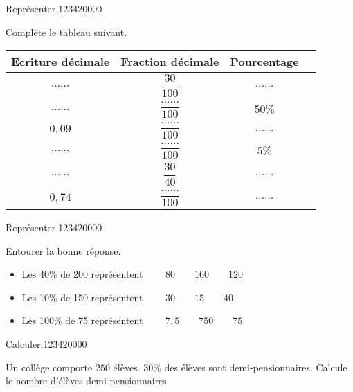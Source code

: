\begin{pageParcoursu} 

 
\begin{ExoCu}{Représenter.}{1234}{2}{0}{0}{0}{0}

Complète le tableau suivant.

 \begin{tabular}{|c|c|c|c|}
  \hline 
  Ecriture décimale & Fraction décimale & Pourcentage \\ 
  \hline 
  $\ldots\ldots$  & $\dfrac{30}{100}$  &  $\ldots\ldots$  \\ 
  \hline 
  $\ldots\ldots$  & $\dfrac{\ldots\ldots}{100}$    & $50\%$  \\ 
  \hline 
 $0,09$  & $\dfrac{\ldots\ldots}{100}$   & $\ldots\ldots$   \\ 
  \hline 
$\ldots\ldots$    & $\dfrac{\ldots\ldots}{100}$   &  $5\%$   \\ 
  \hline 
$\ldots\ldots$    & $\dfrac{30}{40}$   &  $\ldots\ldots$   \\ 
  \hline 
 $0,74$   &  $\dfrac{\ldots\ldots}{100}$  &  $\ldots\ldots$   \\ 
  \hline
  \end{tabular}  

\end{ExoCu}

\begin{ExoCu}{Représenter.}{1234}{2}{0}{0}{0}{0}

Entourer la bonne réponse.
\begin{itemize}[leftmargin=*]
\item Les 40\% de 200 représentent	$\quad \quad 80	\quad\quad 160\quad\quad	120$ \vspace{0.1cm}
\item Les 10\% de 150 représentent	$\quad\quad 30	\quad\quad 15	\quad\quad40$\vspace{0.1cm}
\item Les 100\% de 75 représentent	$\quad\quad 7,5 \quad\quad 750	\quad\quad 75$\vspace{0.1cm}
\end{itemize}


\end{ExoCu}

\begin{ExoCu}{ Calculer.}{1234}{2}{0}{0}{0}{0}

Un collège comporte $250$ élèves. $30\%$ des élèves sont demi-pensionnaires. Calcule le nombre d'élèves demi-pensionnaires. 
 


\end{ExoCu}
\end{pageParcoursu}
